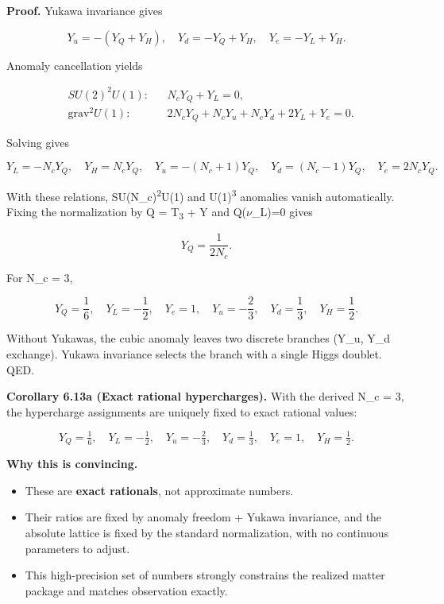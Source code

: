 \textbf{Proof.} Yukawa invariance gives

\[
Y_u = -(Y_Q + Y_H),\quad
Y_d = -Y_Q + Y_H,\quad
Y_e = -Y_L + Y_H.
\]

Anomaly cancellation yields

\[
\begin{aligned}
&SU(2)^2 U(1): && N_c Y_Q + Y_L = 0,\\
&\mathrm{grav}^2 U(1): && 2 N_c Y_Q + N_c Y_u + N_c Y_d + 2 Y_L + Y_e = 0.
\end{aligned}
\]

Solving gives

\[
Y_L = -N_c Y_Q,\quad
Y_H = N_c Y_Q,\quad
Y_u = -(N_c + 1) Y_Q,\quad
Y_d = (N_c - 1) Y_Q,\quad
Y_e = 2 N_c Y_Q.
\]

With these relations, SU(N\_c)\textsuperscript{2}U(1) and U(1)\textsuperscript{3} anomalies vanish automatically. Fixing the normalization by Q = T\textsubscript{3} + Y and Q(\ensuremath{\nu}\_L)=0 gives

\[
Y_Q = \frac{1}{2 N_c}.
\]

For N\_c = 3,

\[
Y_Q = \frac{1}{6},\quad Y_L = -\frac{1}{2},\quad Y_e = 1,\quad
Y_u = -\frac{2}{3},\quad Y_d = \frac{1}{3},\quad Y_H = \frac{1}{2}.
\]

Without Yukawas, the cubic anomaly leaves two discrete branches (Y\_u, Y\_d exchange). Yukawa invariance selects the branch with a single Higgs doublet. QED.

\textbf{Corollary 6.13a (Exact rational hypercharges).} With the derived N\_c = 3, the hypercharge assignments are uniquely fixed to exact rational values:

\[
Y_Q = \tfrac{1}{6}, \quad
Y_L = -\tfrac{1}{2}, \quad
Y_u = -\tfrac{2}{3}, \quad
Y_d = \tfrac{1}{3}, \quad
Y_e = 1, \quad
Y_H = \tfrac{1}{2}.
\]

\textbf{Why this is convincing.}

\begin{itemize}
\tightlist
\item
  These are \textbf{exact rationals}, not approximate numbers.
\item
  Their ratios are fixed by anomaly freedom + Yukawa invariance, and the absolute lattice is fixed by the standard normalization, with no continuous parameters to adjust.
\item
  This high-precision set of numbers strongly constrains the realized matter package and matches observation exactly.
\end{itemize}

